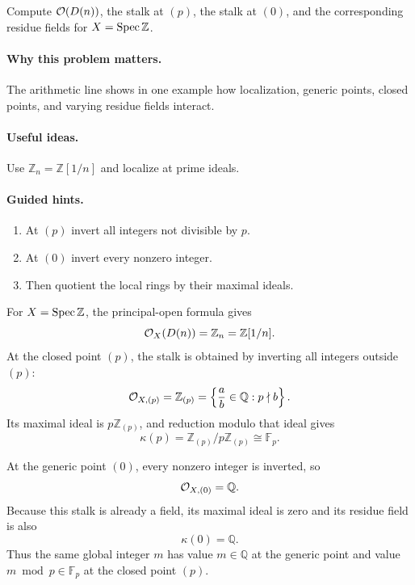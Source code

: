 \begin{problem}\label{prob:vi17-p07}
Compute $\mathcal O(D(n))$, the stalk at $(p)$, the stalk at $(0)$, and the corresponding residue fields for $X=\operatorname{Spec}\mathbb Z$.
\end{problem}

\ifdefined\FullProblemDossiers
\paragraph{Why this problem matters.}
The arithmetic line shows in one example how localization, generic points, closed points, and varying residue fields interact.

\paragraph{Useful ideas.}
Use $\mathbb Z_n=\mathbb Z[1/n]$ and localize at prime ideals.

\paragraph{Guided hints.}
\begin{enumerate}
\item At $(p)$ invert all integers not divisible by $p$.
\item At $(0)$ invert every nonzero integer.
\item Then quotient the local rings by their maximal ideals.
\end{enumerate}

\begin{solution}
For $X=\operatorname{Spec}\mathbb Z$, the principal-open formula gives
\[
\mathcal O_X(D(n))=\mathbb Z_n=\mathbb Z[1/n].
\]
At the closed point $(p)$, the stalk is obtained by inverting all integers outside $(p)$:
\[
\mathcal O_{X,(p)}=\mathbb Z_{(p)}
=\left\{\frac ab\in\mathbb Q:p\nmid b\right\}.
\]
Its maximal ideal is $p\mathbb Z_{(p)}$, and reduction modulo that ideal gives
\[
\kappa(p)=\mathbb Z_{(p)}/p\mathbb Z_{(p)}\cong\mathbb F_p.
\]

At the generic point $(0)$, every nonzero integer is inverted, so
\[
\mathcal O_{X,(0)}=\mathbb Q.
\]
Because this stalk is already a field, its maximal ideal is zero and its residue field is also
\[
\kappa(0)=\mathbb Q.
\]
Thus the same global integer $m$ has value $m\in\mathbb Q$ at the generic point and value $m\bmod p\in\mathbb F_p$ at the closed point $(p)$.
\end{solution}



